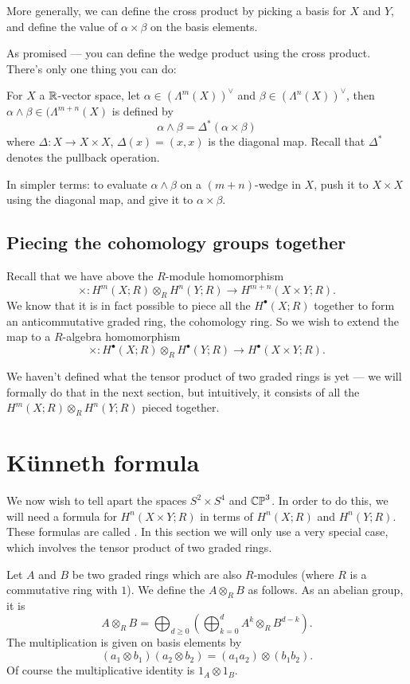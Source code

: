 More generally, we can define the cross product by picking a basis for $X$ and $Y$, and define the
value of $\alpha \times \beta$ on the basis elements.

As promised --- you can define the wedge product using the cross product.
There's only one thing you can do:
\begin{definition}
	For $X$ a $\mathbb R$-vector space,
	let $\alpha \in (\Lambda^m(X))^\vee$ and $\beta \in (\Lambda^n(X))^\vee$,
	then $\alpha \wedge \beta \in (\Lambda^{m + n}(X)$ is defined by
	\[
		\alpha \wedge \beta = \Delta^*(\alpha \times \beta)
	\]
	where $\Delta \colon X \to X \times X$, $\Delta(x) = (x, x)$ is the diagonal map.
	Recall that $\Delta^*$ denotes the pullback operation.
\end{definition}
In simpler terms:
to evaluate $\alpha \wedge \beta$ on a $(m + n)$-wedge in $X$,
push it to $X \times X$ using the diagonal map, and give it to $\alpha \times \beta$.

\subsection{Piecing the cohomology groups together}

Recall that we have above the $R$-module homomorphism
\[ \times \colon H^m(X; R) \otimes_R H^n(Y; R) \to H^{m + n}(X \times Y; R). \]
We know that it is in fact possible to piece all the $H^\bullet(X; R)$ together to form
an anticommutative graded ring, the cohomology ring. So we wish to extend the map to a
$R$-algebra homomorphism
\[ \times \colon H^\bullet(X; R) \otimes_R H^\bullet(Y; R) \to H^\bullet(X \times Y; R). \]

We haven't defined what the tensor product of two graded rings is yet --- we will formally do that
in the next section, but intuitively, it consists of all the $H^m(X; R) \otimes_R H^n(Y; R)$
pieced together.

\section{K\"unneth formula}
We now wish to tell apart the spaces $S^2 \times S^4$ and $\mathbb{CP}^3$.
In order to do this, we will need a formula
for $H^n(X \times Y; R)$ in terms of $H^n(X;R)$ and $H^n(Y;R)$.
These formulas are called .
In this section we will only use a very special case,
which involves the tensor product of two graded rings.

\begin{definition}
	Let $A$ and $B$ be two graded rings which are also $R$-modules
	(where $R$ is a commutative ring with $1$).
	We define the  $A \otimes_R B$ as follows.
	As an abelian group, it is
	\[ A \otimes_R B = \bigoplus_{d \ge 0}
		\left( \bigoplus_{k=0}^{d} A^k \otimes_R B^{d-k}  \right). \]
	The multiplication is given on basis elements by
	\[ \left( a_1 \otimes b_1 \right)\left( a_2 \otimes b_2 \right)
		= (a_1a_2) \otimes (b_1b_2).
	\]
	Of course the multiplicative identity is $1_A \otimes 1_B$.
\end{definition}

